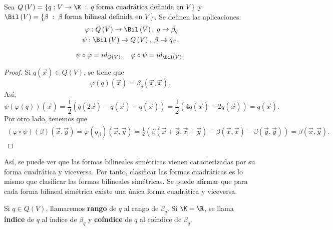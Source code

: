 Sea $\displaystyle Q\left(V\right)= \left\{ q : V \to \K \; : \; q \; \text{forma cuadrática definida en } V\right\}  $ y $\displaystyle \Bil\left(V\right) = \left\{ \beta \; : \; \beta \; \text{forma bilineal definida en } V\right\}  $. Se definen las aplicaciones:
\[
\begin{split}
 \varphi: Q\left(V\right) \to \Bil\left(V\right), \; q \to \beta _{q} \\
 \psi : \Bil\left(V\right) \to Q\left(V\right), \; \beta \to q_{\beta}.
\end{split}
\]
\begin{ftheorem}[]
\normalfont 
\[ \psi \circ \varphi = id _{Q\left(V\right)}, \quad \varphi\circ\psi = id _{\Bil\left(V\right)} .\]
\end{ftheorem}
\begin{proof}
Si $\displaystyle q\left(\vec{x}\right) \in Q\left(V\right) $, se tiene que
\[ \varphi\left(q\right) \left(\vec{x}\right) = \beta_{q}\left(\vec{x}, \vec{x}\right) .\]
Así, 
\[\psi\left(\varphi\left(q\right)\right)\left(\vec{x}\right) = \frac{1}{2}\left(q\left(2\vec{x}\right)-q\left(\vec{x}\right)-q\left(\vec{x}\right)\right) = \frac{1}{2}\left(4q\left(\vec{x}\right)-2q\left(\vec{x}\right)\right) = q\left(\vec{x}\right) .\]
Por otro lado, tenemos que 
\[
\begin{split}
	\left(\varphi\circ\psi\right)\left(\beta \right)\left(\vec{x}, \vec{y}\right) =  \varphi\left(q_{\beta }\right)\left(\vec{x}, \vec{y}\right)=\frac{1}{2}\left(\beta\left(\vec{x}+\vec{y},\vec{x}+\vec{y}\right)-\beta\left(\vec{x}, \vec{x}\right)-\beta\left(\vec{y}, \vec{y}\right)\right) 
	=  \beta\left(\vec{x}, \vec{y}\right).
\end{split}
\]
\end{proof}
\begin{observation}
\normalfont Así, se puede ver que las formas bilineales simétricas vienen caracterizadas por su forma cuadrática y viceversa. Por tanto, clasificar las formas cuadráticas es lo mismo que clasificar las formas bilineales simétricas. Se puede afirmar que para cada forma bilineal simétrica existe una única forma cuadrática y viceversa.
\end{observation}
\begin{fdefinition}[]
\normalfont Si $\displaystyle q \in Q\left(V\right) $, llamaremos \textbf{rango} de $\displaystyle q $ al rango de $\displaystyle \beta_{q} $. Si $\displaystyle \K = \R $, se llama \textbf{índice} de $\displaystyle q $ al índice de $\displaystyle \beta_{q} $ y \textbf{coíndice} de $\displaystyle q $ al coíndice de $\displaystyle \beta_{q} $.
\end{fdefinition}
